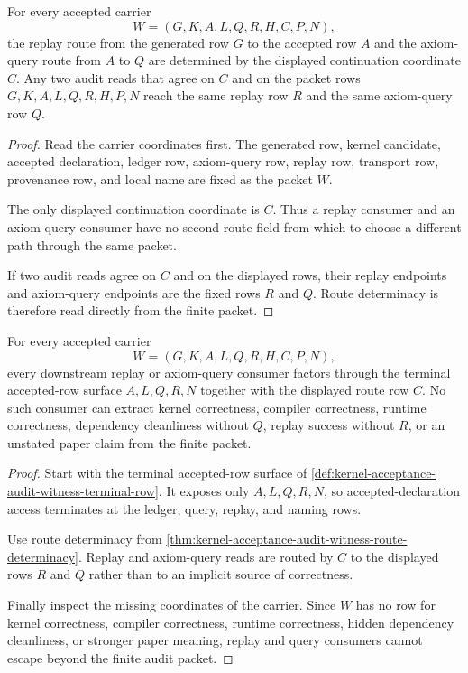 \begin{theorem}
\label{thm:kernel-acceptance-audit-witness-route-determinacy}
For every accepted carrier
$$
W=(G,K,A,L,Q,R,H,C,P,N),
$$
the replay route from the generated row $G$ to the accepted row $A$ and the axiom-query route from $A$ to $Q$ are determined by the displayed continuation coordinate $C$. Any two audit reads that agree on $C$ and on the packet rows $G,K,A,L,Q,R,H,P,N$ reach the same replay row $R$ and the same axiom-query row $Q$.
\end{theorem}
\begin{proof}
Read the carrier coordinates first. The generated row, kernel candidate, accepted declaration, ledger row, axiom-query row, replay row, transport row, provenance row, and local name are fixed as the packet $W$.

The only displayed continuation coordinate is $C$. Thus a replay consumer and an axiom-query consumer have no second route field from which to choose a different path through the same packet.

If two audit reads agree on $C$ and on the displayed rows, their replay endpoints and axiom-query endpoints are the fixed rows $R$ and $Q$. Route determinacy is therefore read directly from the finite packet.
\end{proof}

\begin{theorem}
\label{thm:kernel-acceptance-audit-witness-nonescape}
For every accepted carrier
$$
W=(G,K,A,L,Q,R,H,C,P,N),
$$
every downstream replay or axiom-query consumer factors through the terminal accepted-row surface $A,L,Q,R,N$ together with the displayed route row $C$. No such consumer can extract kernel correctness, compiler correctness, runtime correctness, dependency cleanliness without $Q$, replay success without $R$, or an unstated paper claim from the finite packet.
\end{theorem}
\begin{proof}
Start with the terminal accepted-row surface of \autoref{def:kernel-acceptance-audit-witness-terminal-row}. It exposes only $A,L,Q,R,N$, so accepted-declaration access terminates at the ledger, query, replay, and naming rows.

Use route determinacy from \autoref{thm:kernel-acceptance-audit-witness-route-determinacy}. Replay and axiom-query reads are routed by $C$ to the displayed rows $R$ and $Q$ rather than to an implicit source of correctness.

Finally inspect the missing coordinates of the carrier. Since $W$ has no row for kernel correctness, compiler correctness, runtime correctness, hidden dependency cleanliness, or stronger paper meaning, replay and query consumers cannot escape beyond the finite audit packet.
\end{proof}

